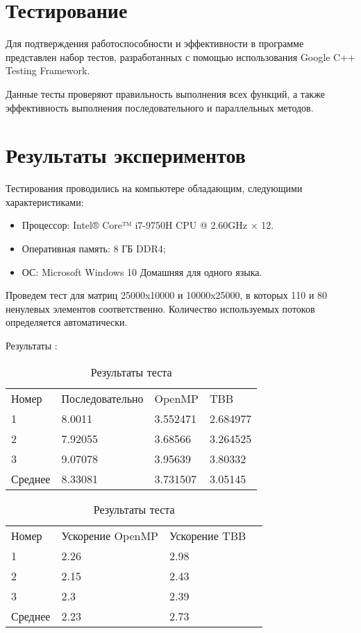 \documentclass{report}
\begin{document}
\section*{Тестирование}
Для подтверждения работоспособности и эффективности в программе представлен набор тестов, разработанных с помощью использования Google C++ Testing Framework.
\par Данные тесты проверяют правильность выполнения всех функций, а также эффективность выполнения последовательного и параллельных методов.
\newpage

\section*{Результаты экспериментов}
Тестирования проводились на компьютере обладающим, следующими характеристиками:

\begin{itemize}
\item Процессор: Intel® Core™ i7-9750H CPU @ 2.60GHz × 12.
\item Оперативная память: 8 ГБ DDR4;
\item ОС: Microsoft Windows 10 Домашняя для одного языка.
\end{itemize}

\par Проведем тест для матриц 25000x10000 и 10000x25000, в которых 110 и 80 ненулевых элементов соответственно. Количество используемых потоков определяется автоматически.
\par Результаты :

\begin{table}[!h]
\caption{Результаты теста}
\centering
\begin{tabular}{p{2cm} p{5cm} p{4cm} p{4cm}}
Номер & Последовательно & OpenMP     & TBB  \\
1     &   8.0011       &  3.552471   &   2.684977   \\
2      &  7.92055       &  3.68566   &   3.264525   \\
3      &   9.07078       &   3.95639   &   3.80332  \\
Среднее     &   8.33081      &   3.731507   &  3.05145  \\
\end{tabular}
\end{table}
\begin{table}[!h]
\caption{Результаты теста}
\centering
\begin{tabular}{p{2cm} p{5cm} p{4cm} p{4cm}}
 Номер & Ускорение OpenMP & Ускорение TBB \\
1        & 2.26 & 2.98 \\
2        &  2.15 & 2.43 \\
3         &  2.3 & 2.39\\
Среднее   &  2.23 & 2.73 \\
\end{tabular}
\end{table}
\end{document}
